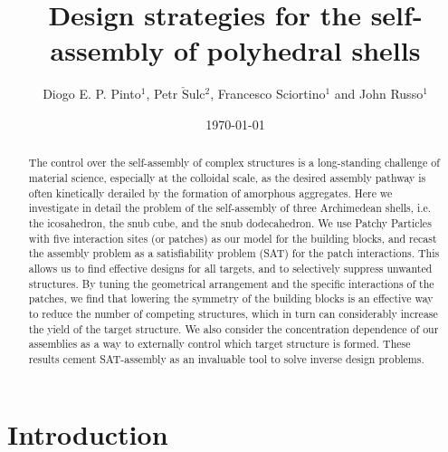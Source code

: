 \documentclass[a4paper, amsfonts, amssymb, amsmath, reprint, showkeys, nofootinbib, twoside]{revtex4-1}
\begin{document}
\title{Design strategies for the self-assembly of polyhedral shells}

\author{Diogo E. P. Pinto$^1$, Petr $\check{\text{S}}$ulc$^2$, Francesco Sciortino$^1$ and John Russo$^1$}

\date{\today} %

\begin{abstract}
The control over the self-assembly of complex structures is a long-standing challenge of material science, especially at the colloidal scale, as the desired assembly pathway is often kinetically derailed by the formation of amorphous aggregates. Here we investigate in detail the problem of the self-assembly of
three Archimedean shells,
i.e. the icosahedron, the snub cube, and the snub dodecahedron. We use Patchy Particles with five interaction sites (or patches) as our model for the building blocks, and recast the assembly problem as a satisfiability problem (SAT) for the patch interactions. This allows us to find effective designs for all targets, and to selectively suppress unwanted structures.
By tuning the geometrical arrangement and the specific interactions of the patches, we find 
that lowering the symmetry of the building blocks is an effective way to reduce the number of competing structures, which in turn can considerably increase the yield of the target structure. We also consider the concentration dependence of our assemblies as a way to externally control which target structure is formed. These results cement SAT-assembly as an invaluable tool to solve inverse design problems.
\end{abstract}

\maketitle

\section{Introduction}
\end{document}

